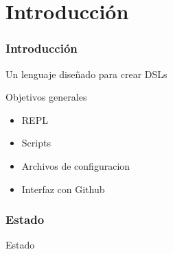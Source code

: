 \section{Introducción}
\begin{frame}
  \frametitle{Introducción}
  \begin{center}
    Un lenguaje diseñado para crear DSLs
  \end{center}


  \begin{center}
    Objetivos generales

    \begin{itemize}
      \item REPL
      \item Scripts
      \item Archivos de configuracion
      \item Interfaz con Github
    \end{itemize}
  \end{center}

  \framebreak

  \frametitle{Estado}
  \begin{center}
    Estado
  \end{center}

  \framebreak


\end{frame}
